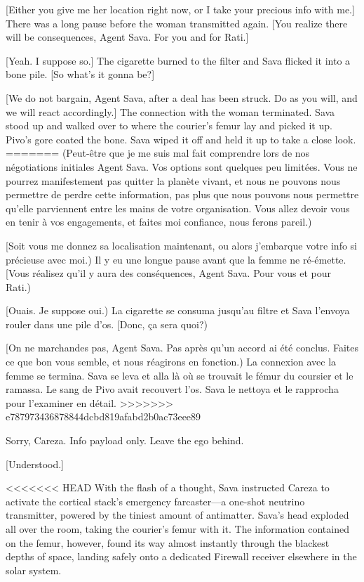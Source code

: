 [Either you give me her location right now, or I take your precious info with me.] There was a long pause before the woman transmitted again. [You realize there will be consequences, Agent Sava. For you and for Rati.] 

[Yeah. I suppose so.] The cigarette burned to the filter and Sava flicked it into a bone pile. [So what's it gonna be?] 

[We do not bargain, Agent Sava, after a deal has been struck. Do as you will, and we will react accordingly.] The connection with the woman terminated. Sava stood up and walked over to where the courier's femur lay and picked it up. Pivo's gore coated the bone. Sava wiped it off and held it up to take a close look. 
=======
(Peut-être que je me suis mal fait comprendre lors de nos négotiations initiales Agent Sava. Vos options sont quelques peu limitées. Vous ne pourrez manifestement pas quitter la planète vivant, et nous ne pouvons nous permettre de perdre cette information, pas plus que nous pouvons nous permettre qu'elle parviennent entre les mains de votre organisation. Vous allez devoir vous en tenir à vos engagements, et faites moi confiance, nous ferons pareil.) 

[Soit vous me donnez sa localisation maintenant, ou alors j'embarque votre info si précieuse avec moi.) Il y eu une longue pause avant que la femme ne ré-émette. [Vous réalisez qu'il y aura des conséquences, Agent Sava. Pour vous et pour Rati.) 

[Ouais. Je suppose oui.) La cigarette se consuma jusqu'au filtre et Sava l'envoya rouler dans une pile d'os. [Donc, ça sera quoi?) 

[On ne marchandes pas, Agent Sava. Pas après qu'un accord ai été conclus. Faites ce que bon vous semble, et nous réagirons en fonction.) La connexion avec la femme se termina. Sava se leva et alla là où se trouvait le fémur du coursier et le ramassa. Le sang de Pivo avait recouvert l'os. Sava le nettoya et le rapprocha pour l'examiner en détail. 
>>>>>>> e787973436878844dcbd819afabd2b0ac73eee89

Sorry, Careza. Info payload only. Leave the ego behind. 

[Understood.] 

<<<<<<< HEAD
With the flash of a thought, Sava instructed Careza to activate the cortical stack's emergency farcaster—a one-shot neutrino transmitter, powered by the tiniest amount of antimatter. Sava's head exploded all over the room, taking the courier's femur with it. The information contained on the femur, however, found its way almost instantly through the blackest depths of space, landing safely onto a dedicated Firewall receiver elsewhere in the solar system. 

